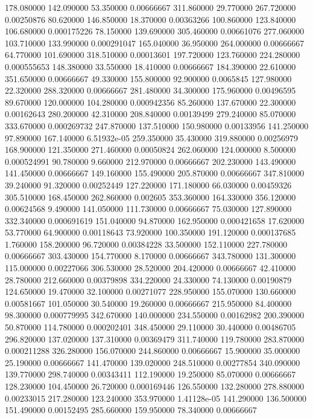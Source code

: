 178.080000	142.090000	53.350000	0.00666667
311.860000	29.770000	267.720000	0.00250876
80.620000	146.850000	18.370000	0.00363266
100.860000	123.840000	106.680000	0.000175226
78.150000	139.690000	305.460000	0.00661076
277.060000	103.710000	133.990000	0.000291047
165.040000	36.950000	264.000000	0.00666667
64.770000	101.690000	318.510000	0.00013601
197.720000	123.760000	224.280000	0.000555653
148.380000	33.550000	18.410000	0.00666667
184.390000	22.610000	351.650000	0.00666667
49.330000	155.800000	92.900000	0.0065845
127.980000	22.320000	288.320000	0.00666667
281.480000	34.300000	175.960000	0.00496595
89.670000	120.000000	104.280000	0.000942356
85.260000	137.670000	22.300000	0.00162643
280.200000	42.310000	208.840000	0.00139499
279.240000	85.070000	333.670000	0.000269732
247.870000	137.510000	150.980000	0.00133956
141.250000	97.890000	167.140000	6.51932e-05
259.350000	35.430000	319.880000	0.00256979
168.900000	121.350000	271.460000	0.00050824
262.060000	124.000000	8.500000	0.000524991
90.780000	9.660000	212.970000	0.00666667
202.230000	143.490000	141.450000	0.00666667
149.160000	155.490000	205.870000	0.00666667
347.810000	39.240000	91.320000	0.00252449
127.220000	171.180000	66.030000	0.00459326
305.510000	168.450000	262.860000	0.002605
353.360000	164.330000	356.120000	0.00624568
9.490000	141.050000	111.730000	0.00666667
75.030000	127.890000	332.340000	0.000691619
151.040000	94.870000	162.950000	0.000421658
17.620000	53.770000	64.900000	0.00118643
73.920000	100.350000	191.120000	0.000137685
1.760000	158.200000	96.720000	0.00384228
33.500000	152.110000	227.780000	0.00666667
303.430000	154.770000	8.170000	0.00666667
343.780000	131.300000	115.000000	0.00227066
306.530000	28.520000	204.420000	0.00666667
42.410000	28.780000	212.660000	0.00379898
334.220000	24.330000	74.130000	0.00190879
124.650000	19.470000	32.100000	0.00271077
228.950000	155.070000	130.660000	0.00581667
101.050000	30.540000	19.260000	0.00666667
215.950000	84.400000	98.300000	0.000779995
342.670000	140.000000	234.550000	0.00162982
200.390000	50.870000	114.780000	0.000202401
348.450000	29.110000	30.440000	0.00486705
296.820000	137.020000	137.310000	0.00369479
311.740000	119.780000	283.870000	0.000211288
326.280000	156.070000	244.860000	0.00666667
15.900000	35.000000	25.190000	0.00666667
141.470000	139.020000	248.510000	0.00277854
340.090000	139.770000	298.740000	0.00343411
112.190000	19.250000	85.070000	0.00666667
128.230000	104.450000	26.720000	0.000169446
126.550000	132.280000	278.880000	0.00233015
217.280000	123.240000	353.970000	1.41128e-05
141.290000	136.500000	151.490000	0.00152495
285.660000	159.950000	78.340000	0.00666667

